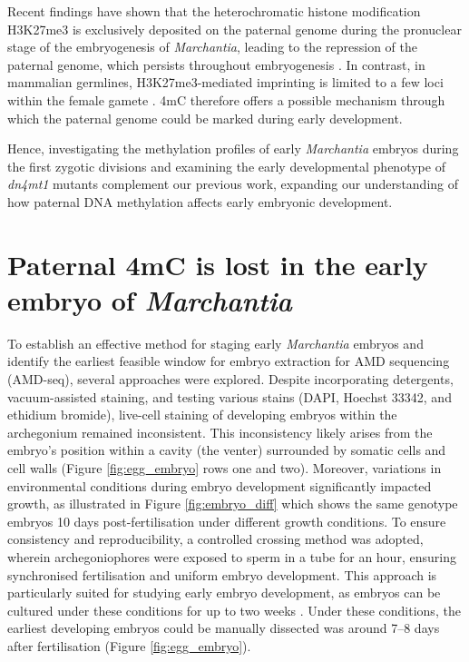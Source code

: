Recent findings have shown that the heterochromatic histone modification H3K27me3 is exclusively deposited on the paternal genome during the pronuclear stage of the embryogenesis of \textit{Marchantia}, leading to the repression of the paternal genome, which persists throughout embryogenesis \cite{RN160}. In contrast, in mammalian germlines, H3K27me3-mediated imprinting is limited to a few loci within the female gamete \cite{RN172}. 4mC therefore offers a possible mechanism through which the paternal genome could be marked during early development.

Hence, investigating the methylation profiles of early \textit{Marchantia} embryos during the first zygotic divisions and examining the early developmental phenotype of \textit{dn4mt1} mutants complement our previous work, expanding our understanding of how paternal DNA methylation affects early embryonic development.

\clearpage

\section{Paternal 4mC is lost in the early embryo of \textit{Marchantia}}

To establish an effective method for staging early \textit{Marchantia} embryos and identify the earliest feasible window for embryo extraction for AMD sequencing (AMD-seq), several approaches were explored. Despite incorporating detergents, vacuum-assisted staining, and testing various stains (DAPI, Hoechst 33342, and ethidium bromide), live-cell staining of developing embryos within the archegonium remained inconsistent. This inconsistency likely arises from the embryo's position within a cavity (the venter) surrounded by somatic cells and cell walls (Figure \ref{fig:egg_embryo} rows one and two). Moreover, variations in environmental conditions during embryo development significantly impacted growth, as illustrated in Figure \ref{fig:embryo_diff} which shows the same genotype embryos 10 days post-fertilisation under different growth conditions. To ensure consistency and reproducibility, a controlled crossing method was adopted, wherein archegoniophores were exposed to sperm in a tube for an hour, ensuring synchronised fertilisation and uniform embryo development. This approach is particularly suited for studying early embryo development, as embryos can be cultured under these conditions for up to two weeks \cite{RN139}. Under these conditions, the earliest developing embryos could be manually dissected was around 7–8 days after fertilisation (Figure \ref{fig:egg_embryo}).

